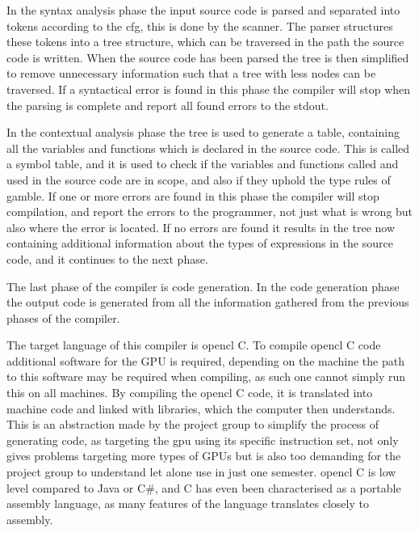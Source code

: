In the syntax analysis phase the input source code is parsed and separated into tokens according to the \acrshort{cfg}, this is done by the scanner. 
The parser structures these tokens into a tree structure, which can be traversed in the path the source code is written.
When the source code has been parsed the tree is then simplified to remove unnecessary information such that a tree with less nodes can be traversed.
If a syntactical error is found in this phase the compiler will stop when the parsing is complete and report all found errors to the stdout.

In the contextual analysis phase the tree is used to generate a table, containing all the variables and functions which is declared in the source code.
This is called a symbol table, and it is used to check if the variables and functions called and used in the source code are in scope, and also if they uphold the type rules of \gls{gamble}.
If one or more errors are found in this phase the compiler will stop compilation, and report the errors to the programmer, not just what is wrong but also where the error is located.
If no errors are found it results in the tree now containing additional information about the types of expressions in the source code, and it continues to the next phase.

The last phase of the compiler is code generation.
In the code generation phase the output code is generated from all the information gathered from the previous phases of the compiler.

The target language of this compiler is \gls{opencl} C.
To compile \gls{opencl} C code additional software for the GPU is required, depending on the machine the path to this software may be required when compiling, as such one cannot simply run this on all machines.
By compiling the \gls{opencl} C code, it is translated into machine code and linked with libraries, which the computer then understands.
This is an abstraction made by the project group to simplify the process of generating code, as targeting the \acrshort{gpu} using its specific instruction set, not only gives problems targeting more types of GPUs but is also too demanding for the project group to understand let alone use in just one semester.
\gls{opencl} C is low level compared to Java or C\#, and C has even been characterised as a portable assembly language, as many features of the language translates closely to assembly. \citep{CPort}

